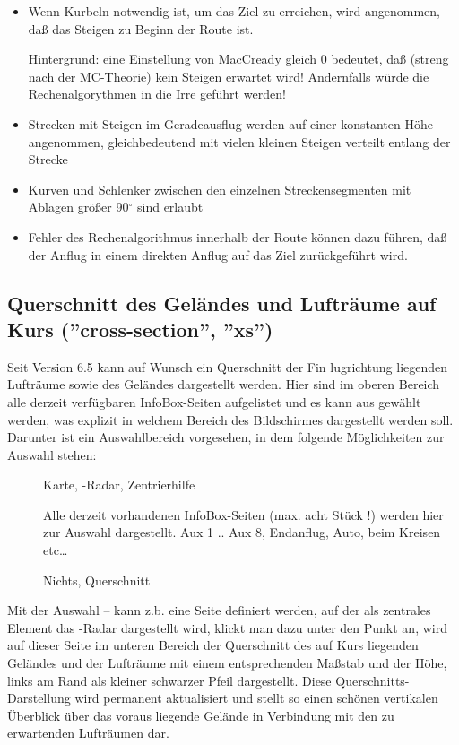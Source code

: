 \begin{itemize}
\item Wenn Kurbeln notwendig ist, um das Ziel zu erreichen,  wird angenommen, daß das Steigen zu Beginn der Route ist. 

Hintergrund: eine Einstellung von  MacCready gleich 0 bedeutet, daß (streng nach der MC-Theorie) kein Steigen erwartet wird!  Andernfalls würde die Rechenalgorythmen in  die Irre geführt werden!   
\item Strecken mit Steigen im Geradeausflug werden auf einer konstanten Höhe angenommen, gleichbedeutend mit vielen kleinen Steigen verteilt entlang der Strecke
\item Kurven und Schlenker zwischen den einzelnen Streckensegmenten mit Ablagen größer 90$^\circ$ sind erlaubt
\item Fehler des Rechenalgorithmus innerhalb der Route können dazu führen, daß der Anflug in einem direkten Anflug auf das Ziel zurückgeführt wird.
\end{itemize}


\subsection*{Querschnitt des Geländes und Lufträume auf Kurs (''cross-section'', ''xs'')}
\label{cross-section}

Seit Version 6.5 kann auf Wunsch  ein Querschnitt der Fin lugrichtung liegenden
 Lufträume sowie des Geländes
dargestellt werden. Hier sind im oberen Bereich alle derzeit verfügbaren InfoBox-Seiten
aufgelistet und es kann aus gewählt werden, was explizit in welchem Bereich des Bildschirmes
  dargestellt werden soll.
 Darunter ist ein Auswahlbereich vorgesehen, in dem folgende
Möglichkeiten zur Auswahl stehen:
 \begin{description}
 \item[] Karte, \fl-Radar, Zentrierhilfe
 \item[] Alle derzeit vorhandenen InfoBox-Seiten (max. acht Stück !) werden hier
     zur Auswahl dargestellt. Aux 1 .. Aux 8, Endanflug, Auto, beim Kreisen etc\dots
 \item[] Nichts, Querschnitt
 \end{description}

Mit der Auswahl -- kann z.b. eine Seite definiert werden,
auf der als zentrales Element das \fl-Radar dargestellt wird, klickt man dazu unter
 den Punkt an, wird auf dieser Seite im unteren Bereich der
Querschnitt des auf Kurs liegenden Geländes und der Lufträume mit einem entsprechenden
Maßstab und der Höhe, links am Rand als kleiner schwarzer Pfeil dargestellt. Diese
Querschnitts-Darstellung  wird permanent aktualisiert und stellt so einen schönen  vertikalen
Überblick über das voraus liegende Gelände in Verbindung mit den zu erwartenden Lufträumen
dar.

